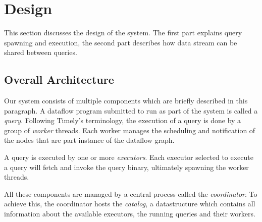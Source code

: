 \chapter{Design}\label{ch:design}

This section discusses the design of the system. The first part explains query
spawning and execution, the second part describes how data stream can be shared
between queries.

\section{Overall Architecture}

Our system consists of multiple components which are briefly described in this
paragraph. A dataflow program submitted to run as part of the system is
called a \emph{query}. Following Timely's terminology, the execution of a query
is done by a group of \emph{worker} threads. Each worker manages the scheduling and
notification of the nodes that are part instance of the dataflow graph.

A query is executed by one or more \emph{executors}. Each executor selected to
execute a query will fetch and invoke the query binary, ultimately spawning the
worker threads.

All these components are managed by a central process called the
\emph{coordinator}. To achieve this, the coordinator hosts the \emph{catalog}, a
datastructure which contains all information about the available executors, the
running queries and their workers.

